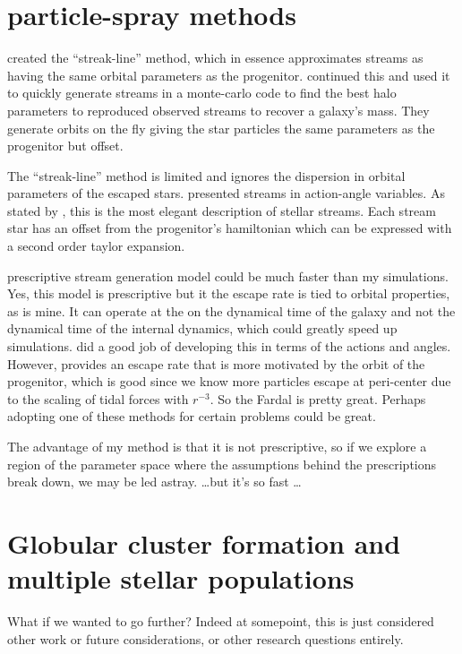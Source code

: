 \section{particle-spray methods}

\citet{2012MNRAS.420.2700K} created the ``streak-line'' method, which in essence approximates streams as having the same orbital parameters as the progenitor. \citet{2014ApJ...795...94B} continued this and used it to quickly generate streams in a monte-carlo code to find the best halo parameters to reproduced observed streams to recover a galaxy's mass. They generate orbits on the fly giving the star particles the same parameters as the progenitor but offset. 

The ``streak-line'' method is limited and ignores the dispersion in orbital parameters of the escaped stars. \citet{2011MNRAS.413.1852E} presented streams in action-angle variables. As stated by \citet{2015MNRAS.452..301F}, this is the most elegant description of stellar streams. Each stream star has an offset from the progenitor's hamiltonian which can be expressed with a second order taylor expansion. 

\citet{2015MNRAS.452..301F} prescriptive stream generation model could be much faster than my simulations. Yes, this model is prescriptive but it the escape rate is tied to orbital properties, as is mine. It can operate at the on the dynamical time of the galaxy and not the dynamical time of the internal dynamics, which could greatly speed up simulations. \citet{2014ApJ...795...95B} did a good job of developing this in terms of the actions and angles. However, \citet{2015MNRAS.452..301F} provides an escape rate that is more motivated by the orbit of the progenitor, which is good since we know more particles escape at peri-center due to the scaling of tidal forces with $r^{-3}$. So the Fardal is pretty great. Perhaps adopting one of these methods for certain problems could be great. 

The advantage of my method is that it is not prescriptive, so if we explore a region of the parameter space where the assumptions behind the prescriptions break down, we may be led astray. \dots but it's so fast \dots 

\section{Globular cluster formation and multiple stellar populations}

    What if we wanted to go further? Indeed at somepoint, this is just considered other work or future considerations, or other research questions entirely. 

